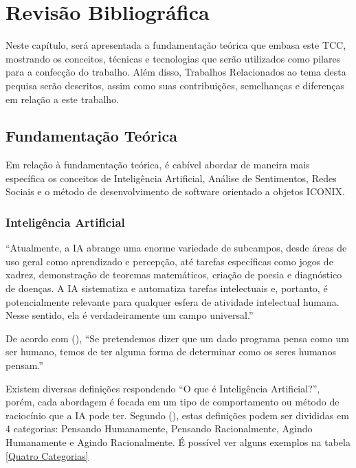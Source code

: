 \documentclass[
	12pt,				%
	openright,			%
	oneside,			%
	a4paper,			%
	english,			%
	spanish,			%
	brazil				%
	]{abntex2}
\begin{document}
\chapter{Revisão Bibliográfica}				

	Neste capítulo, será apresentada a fundamentação teórica que embasa este TCC, mostrando os conceitos, técnicas e tecnologias que serão utilizados como pilares para a confecção do trabalho. Além disso, Trabalhos Relacionados ao tema desta pequisa serão descritos, assim como suas contribuições, semelhanças e diferenças em relação a este trabalho. 

\section{Fundamentação Teórica}
	
	Em relação à fundamentação teórica, é cabível abordar de maneira mais específica os conceitos de Inteligência Artificial, Análise de Sentimentos, Redes Sociais e o método de desenvolvimento de software orientado a objetos ICONIX.

	\subsection{Inteligência Artificial}	
	\begin{citacao} ``Atualmente, a \gls{IA} abrange uma enorme variedade de subcampos, desde áreas de uso geral como aprendizado e percepção, até tarefas específicas como jogos de xadrez, demonstração de teoremas matemáticos, criação de poesia e diagnóstico de doenças. A \gls{IA} sistematiza e automatiza tarefas intelectuais e, portanto, é potencialmente relevante para qualquer esfera de atividade intelectual humana. Nesse sentido, ela é verdadeiramente um campo universal.'' \cite{norvig3rd}
	\end{citacao}

	De acordo com  (\citeyear{norvig3rd}), ``Se pretendemos dizer que um dado programa pensa como um ser humano, temos de ter alguma forma de determinar como os seres humanos pensam.''
	
	Existem diversas definições respondendo ``O que é Inteligência Artificial?'', porém, cada abordagem é focada em um tipo de comportamento ou método de raciocínio que a \gls{IA} pode ter. Segundo  (\citeyear{norvig3rd}), estas definições podem ser divididas em 4 categorias: Pensando Humanamente, Pensando Racionalmente, Agindo Humanamente e Agindo Racionalmente. É possível ver alguns exemplos na tabela \ref{Quatro Categorias}
	
\end{document}
